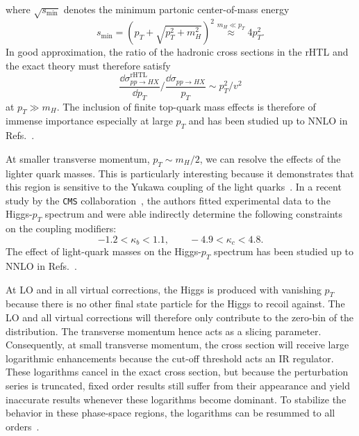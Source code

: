 where $\sqrt{s_\text{min}}$ denotes the minimum partonic center-of-mass energy
\begin{equation}
s_\text{min} = \left(p_T + \sqrt{p_T^2 + m_H^2} \right)^2 \stackrel{m_H \ll p_T}{\approx} 4 p_T^2.
\label{eq:4:smin}
\end{equation}
In good approximation, the ratio of the hadronic cross sections in the \acs{rHTL} and the exact theory must therefore satisfy
\begin{equation}
\frac{\dd \sigma_{pp \rightarrow HX}^{\mathrm{rHTL}}}{\dd p_T} \bigg / \frac{\dd \sigma_{pp \rightarrow HX}}{ p_T} \sim p_T^2/v^2
\label{eq:4:dSig_rHTL/dSig}
\end{equation}
at $p_T \gg m_H$. The inclusion of finite top-quark mass effects is therefore of immense importance especially at large $p_T$ and has been studied up to \acs{NNLO} in Refs.~\cite{Grazzini:2013mca, Buschmann:2014sia, Jones:2018hbb}.

At smaller transverse momentum, $p_T \sim m_H/2$, we can resolve the effects of the lighter quark masses. This is particularly interesting because it demonstrates that this region is sensitive to the Yukawa coupling of the light quarks~\cite{Bishara:2016jga, Bonner:2016sdg}. In a recent study by the \texttt{CMS} collaboration~\cite{CMS:2018gwt}, the authors fitted experimental data to the Higgs-$p_T$ spectrum and were able indirectly determine the following constraints on the coupling modifiers:
\begin{equation}
-1.2 < \kappa_b < 1.1, \qquad -4.9 < \kappa_c < 4.8.
\end{equation}
The effect of light-quark masses on the Higgs-$p_T$ spectrum has been studied up to \acs{NNLO} in Refs.~\cite{Lindert:2017pky, Caola:2018zye, Bonciani:2022jmb,Czakon:2024ywb}.

At \acs{LO} and in all virtual corrections, the Higgs is produced with vanishing $p_T$ because there is no other final state particle for the Higgs to recoil against. The \acs{LO} and all virtual corrections will therefore only contribute to the zero-bin of the distribution. The transverse momentum hence acts as a slicing parameter. Consequently, at small transverse momentum, the cross section will receive large logarithmic enhancements because the cut-off threshold acts an \acs{IR} regulator. These logarithms cancel in the exact cross section, but because the perturbation series is truncated, fixed order results still suffer from their appearance and yield inaccurate results whenever these logarithms become dominant. To stabilize the behavior in these phase-space regions, the logarithms can be resummed to all orders~\cite{Mantler:2012bj,Grazzini:2013mca, Hamilton:2015nsa, Bagnaschi:2015qta, Bagnaschi:2015bop, Frederix:2016cnl, Caola:2016upw, Niggetiedt:2024nmp}.

